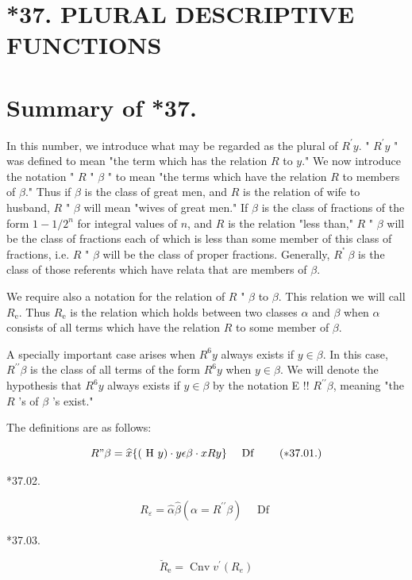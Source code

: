 \documentclass[10pt]{article}
\begin{document}
\section*{*37. PLURAL DESCRIPTIVE FUNCTIONS}
\section*{Summary of *37.}
In this number, we introduce what may be regarded as the plural of $R^{\prime} y$. " $R^{\prime} y$ " was defined to mean "the term which has the relation $R$ to $y$." We now introduce the notation " $R$ " $\beta$ " to mean "the terms which have the relation $R$ to members of $\beta$." Thus if $\beta$ is the class of great men, and $R$ is the relation of wife to husband, $R$ " $\beta$ will mean "wives of great men." If $\beta$ is the class of fractions of the form $1-1 / 2^{n}$ for integral values of $n$, and $R$ is the relation "less than," $R$ " $\beta$ will be the class of fractions each of which is less than some member of this class of fractions, i.e. $R$ " $\beta$ will be the class of proper fractions. Generally, $R^{\text {" }} \beta$ is the class of those referents which have relata that are members of $\beta$.

We require also a notation for the relation of $R$ " $\beta$ to $\beta$. This relation we will call $R_{\mathrm{e}}$. Thus $R_{\mathrm{e}}$ is the relation which holds between two classes $\alpha$ and $\beta$ when $\alpha$ consists of all terms which have the relation $R$ to some member of $\beta$.

A specially important case arises when $R^{6} y$ always exists if $y \in \beta$. In this case, $R^{\prime \prime} \beta$ is the class of all terms of the form $R^{6} y$ when $y \in \beta$. We will denote the hypothesis that $R^{6} y$ always exists if $y \in \beta$ by the notation E !! $R^{\prime \prime} \beta$, meaning "the $R$ 's of $\beta$ 's exist."

The definitions are as follows:


\begin{equation*}
R " \beta=\widehat{x}\{(\text { H } y) \cdot y \epsilon \beta \cdot x R y\} \quad \text { Df } \tag{$* 37.01$.}
\end{equation*}


*37.02.

$$
R_{\varepsilon}=\hat{\alpha} \hat{\beta}\left(\alpha=R^{\prime \prime} \beta\right) \quad \text { Df }
$$

*37.03.

$$
\breve{R}_{\mathrm{e}}=\operatorname{Cnv} v^{\prime}\left(R_{e}\right)
$$
\end{document}
